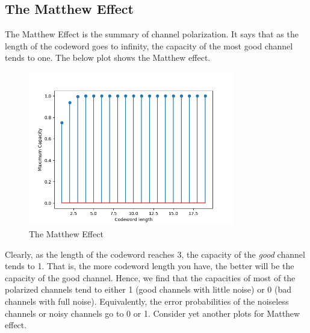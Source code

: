 \documentclass{report}
\begin{document}
\subsection*{The Matthew Effect}
The Matthew Effect is the summary of channel polarization. It says that as the length of the codeword goes to infinity, the capacity of the most good channel tends to one. The below plot shows the Matthew effect.
\begin{figure}[H]
\centering
\includegraphics[width=0.8\textwidth, height=0.4\textheight]{matthew.png}
\caption{The Matthew Effect}
\end{figure}
Clearly, as the length of the codeword reaches 3, the capacity of the \textit{good} channel tends to 1. That is, the more codeword length you have, the better will be the capacity of the good channel. Hence, we find that the capacities of most of the polarized channels tend to either 1 (good channels with little noise) or 0 (bad channels with full noise). Equivalently, the error probabilities of the noiseless channels or noisy channels go to 0 or 1. Consider yet another plots for Matthew effect.
\end{document}
